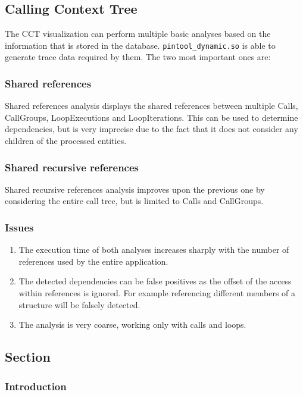 \subsection{Calling Context Tree}

The CCT visualization can perform multiple basic analyses based on the information that is stored in the database. \texttt{pintool\_dynamic.so} is able to generate trace data required by them. The two most important ones are:

\subsubsection{Shared references}

Shared references analysis displays the shared references between multiple Calls, CallGroups, LoopExecutions and LoopIterations. This can be used to determine dependencies, but is very imprecise due to the fact that it does not consider any children of the processed entities.

\subsubsection{Shared recursive references}

Shared recursive references analysis improves upon the previous one by considering the entire call tree, but is limited to Calls and CallGroups.

\subsubsection{Issues}

\begin{enumerate}
	\item The execution time of both analyses increases sharply with the number of references used by the entire application.
	\item The detected dependencies can be false positives as the offset of the access within references is ignored. For example referencing different members of a structure will be falsely detected.
	\item The analysis is very coarse, working only with calls and loops.
\end{enumerate}

\subsection{Section}

\subsubsection{Introduction}

